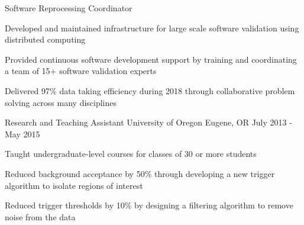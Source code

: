 \begin{cventries}
    \cventry
    {Software Reprocessing Coordinator}
    {}
    {}
    {}
         {
      \begin{cvitems} %
        \item{Developed and maintained infrastructure for large scale software validation using distributed computing }
        \item{Provided continuous software development support by training and coordinating  a team of 15+ software validation experts}
        \item{Delivered 97\% data taking efficiency during 2018 through collaborative problem solving across many disciplines}
      \end{cvitems}
    }
    \vspace{0.5cm}
      \cventry
    {Research and Teaching Assistant} %
    {University of Oregon} %
    {Eugene, OR} %
    {July 2013 - May 2015} %
    {
      \begin{cvitems} %
        \item {Taught undergraduate-level courses for classes of 30 or more students}
        \item{Reduced background acceptance by 50\% through developing a new trigger algorithm to isolate regions of interest}
        \item{Reduced trigger thresholds by 10\% by designing a filtering algorithm to remove noise from the data}
      \end{cvitems}
    }
    
\end{cventries}
